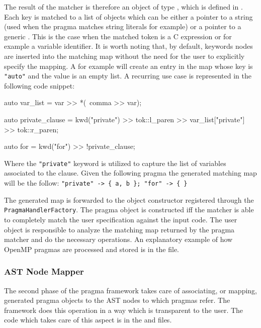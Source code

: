 The result of the matcher is therefore an object of type
, which is defined in
. Each key is matched to a list of objects which
can be either a pointer to a string (used when the pragma matches string
literals for example) or a pointer to a generic . This is the
case when the matched token is a C expression or for example a variable
identifier. It is worth noting that, by default, keywords nodes are inserted into
the matching map without the need for the user to explicitly specify the
mapping. A  for example will create an entry in the map
whose key is {\tt "auto"} and the value is an empty list. A recurring use case
is represented in the following code snippet:

\begin{srcCode}
auto var_list = var >> *(~comma >> var);

auto private_clause = 
	kwd("private") >> tok::l_paren >> var_list["private"] >> tok::r_paren;

auto for = 
	kwd("for") >> !private_clause;
\end{srcCode}

Where the {\tt "private"} keyword is utilized to capture the list of variables
associated to the clause. Given the following pragma  the generated matching map will be the follow: {\tt "private" -> \{
a, b \}; "for" -> \{ \} }

The generated map is forwarded to the object constructor registered through the
{\tt PragmaHandlerFactory}. The pragma object is constructed iff the matcher is
able to completely match the user specification against the input code. The user
object is responsible to analyze the matching map returned by the pragma matcher
and do the necessary operations. An explanatory example of how OpenMP pragmas
are processed and stored is in the 
file. 

\subsubsection{AST Node Mapper}

The second phase of the pragma framework takes care of associating, or mapping,
generated pragma objects to the AST nodes to which pragmas refer. The framework
does this operation in a way which is transparent to the user. The code which
takes care of this aspect is in the  and
 files. 

